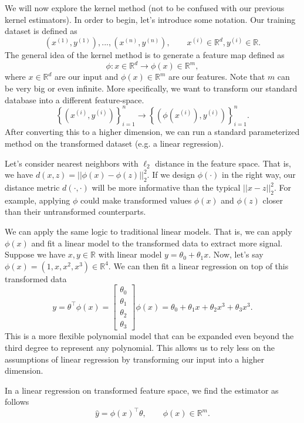 
\noindent We will now explore the kernel method (not to be confused with our previous kernel estimators). In order to begin, let's introduce some notation. Our training dataset is defined as
$$
\left(x^{(1)}, y^{(1)}\right), ..., \left(x^{(n)}, y^{(n)}\right), \qquad x^{(i)} \in \mathbb{R}^d, y^{(i)} \in \mathbb{R}.
$$
The general idea of the kernel method is to generate a feature map defined as 
$$
\phi : x \in \mathbb{R}^d \rightarrow \phi(x) \in \mathbb{R}^m,
$$
where $x \in \mathbb{R}^d$ are our input and $\phi(x) \in \mathbb{R}^m$ are our features. Note that $m$ can be very big or even infinite. More specifically, we want to transform our standard database into a different feature-space.
$$
\left\{ \left( x^{(i)}, y^{(i)} \right) \right\}_{i=1}^n \rightarrow \left\{ \left( \phi \left( x^{(i)} \right), y^{(i)} \right) \right\}_{i=1}^n.
$$
After converting this to a higher dimension, we can run a standard parameterized method on the transformed dataset (e.g. a linear regression).


\begin{example}
	Let's consider nearest neighbors with $\ell_2$ distance in the feature space. That is, we have $d(x, z) = ||\phi(x) - \phi(z)||_2^2$. If we design $\phi(\cdot)$ in the right way, our distance metric $d(\cdot, \cdot)$ will be more informative than the typical $||x - z||_2^2$. For example, applying $\phi$ could make transformed values $\phi(x)$ and $\phi(z)$ closer than their untransformed counterparts.
\end{example} 
\begin{example}
	We can apply the same logic to traditional linear models. That is, we can apply $\phi(x)$ and fit a linear model to the transformed data to extract more signal. Suppose we have $x, y \in \mathbb{R}$ with linear model $y = \theta_0 + \theta_1 x$. Now, let's say $\phi(x) = (1, x, x^2, x^3) \in \mathbb{R}^4$. We can then fit a linear regression on top of this transformed data
	$$
	y = \theta^\top \phi(x) = \begin{bmatrix} \theta_0 \\ \theta_1 \\ \theta_2 \\ \theta_3 \end{bmatrix}\phi(x) = \theta_0 + \theta_1x + \theta_2x^3 + \theta_3x^3.
	$$
	This is a more flexible polynomial model that can be expanded even beyond the third degree to represent any polynomial. This allows us to rely less on the assumptions of linear regression by transforming our input into a higher dimension.
\end{example}
In a linear regression on transformed feature space, we find the estimator as follows
$$
\hat{y} = \phi(x)^\top \theta, \qquad \phi(x) \in \mathbb{R}^m.
$$

